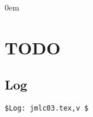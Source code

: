 \documentclass[10pt,a4page]{article}
\begin{document}
\fi

\newcommand{\sourcecodesize}[0]{\scriptsize}

\maketitle              %


\parindent0em



% 




%
%

%

\ifcase \value{mspapertype}
\newpage
\section{TODO}

\newpage

\begin{appendix}

\section{Log}  
\footnotesize

\begin{verbatim}
$Log: jmlc03.tex,v $

\end{verbatim}
\end{appendix}

\or
\makeLLNLBackCover
\or
\or
\fi
\end{document}
